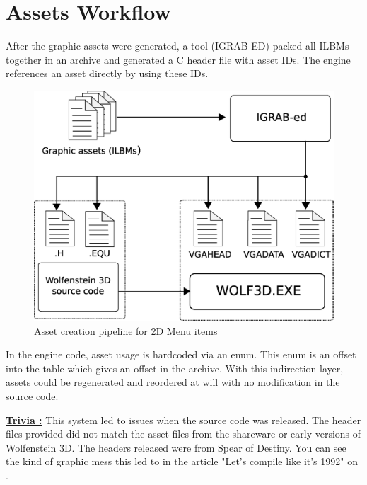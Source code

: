 \documentclass[book.tex]{subfiles}
\begin{document}
\section{Assets Workflow}
After the graphic assets were generated, a tool (IGRAB-ED) packed all ILBMs together in an archive and generated a C header file with asset IDs. The engine references an asset directly by using these IDs.\\
\begin{figure}[H]
\centering
 \includegraphics[width=.9\textwidth]{imgs/drawings/drawing_plain.eps}
 \caption{Asset creation pipeline for 2D Menu items}
 \label{asset-creation-pipeline}
\end{figure}
\par
\begin{minipage}{\textwidth}
 \par
 \end{minipage}
 
 In the engine code, asset usage is hardcoded via an enum. This enum is an offset into the 
  table which gives an offset in the  archive. With this indirection layer, assets could be regenerated and reordered at will with no modification in the source code.\\
 \par
 \begin{minipage}{\textwidth}
 \par
 \end{minipage}


 
\pagebreak
\textbf{\underline{Trivia :}} This system led to issues when the source code was released. The  header files provided did not match the asset files from the shareware or early versions of Wolfenstein 3D. The headers released were from Spear of Destiny. You can see the kind of graphic mess this led to in the article "Let's compile like it's 1992" on .\\
\end{document}
